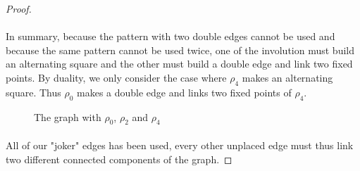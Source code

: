 \begin{proof}
\paragraph{}
In summary, because the pattern with two double edges cannot be used and because the same pattern cannot be used twice, one of the involution must build an alternating square and the other must build a double edge and link two fixed points. By duality, we only consider the case where $\rho_4$ makes an alternating square. Thus $\rho_0$ makes a double edge and links two fixed points of $\rho_4$.

\begin{figure}[H]
  \begin{center}
    \caption{The graph with $\rho_0$, $\rho_2$ and $\rho_4$}
  \end{center}
\end{figure}

\paragraph{}
All of our "joker" edges has been used, every other unplaced edge must thus link two different connected components of the graph.


\end{proof}
